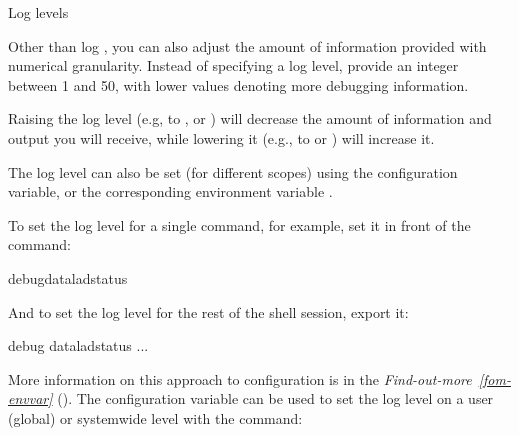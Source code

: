 \begin{findoutmore}[label={fom-loglevels}, before title={\thetcbcounter\ }, float, floatplacement=tbp, check odd page=true]{Log levels}
\begin{itemize}
\end{itemize}

\sphinxAtStartPar
Other than log , you can also adjust the amount of information provided with numerical granularity. Instead of specifying a log level, provide an integer between 1 and 50, with lower values denoting more debugging information.

\sphinxAtStartPar
Raising the log level (e.g, to , or ) will decrease the amount of information and output you will receive, while lowering it (e.g., to  or ) will increase it.

\bigskip

\sphinxAtStartPar
{}

\medskip

\sphinxAtStartPar
The log level can also be set (for different scopes) using the  configuration variable, or the corresponding environment variable .

\sphinxAtStartPar
To set the log level for a single command, for example, set it in front of the command:

\begin{sphinxVerbatim}[commandchars=\\\{\}]
debugdataladstatus
\end{sphinxVerbatim}

\sphinxAtStartPar
And to set the log level for the rest of the shell session, export it:

\begin{sphinxVerbatim}[commandchars=\\\{\}]
debug
dataladstatus
...
\end{sphinxVerbatim}

\sphinxAtStartPar
More information on this approach to configuration is in the
\textit{Find-out-more}~{\findoutmoreiconinline}\textit{\ref{fom-envvar}} {\hyperref[\detokenize{basics/101-123-config2:fom-envvar}]{}} ().
The configuration variable can be used to set the log level on a user (global) or system\sphinxhyphen{}wide level with the  command:


\end{findoutmore}

